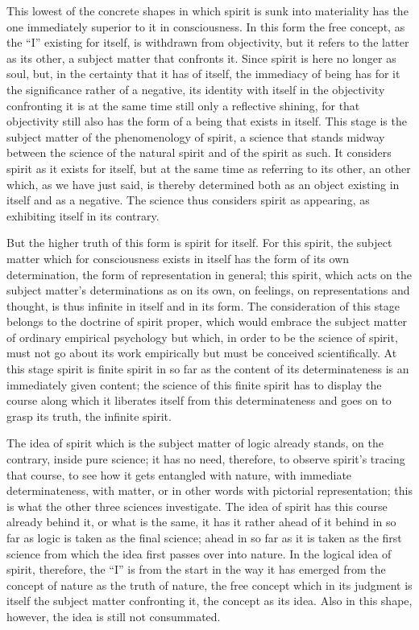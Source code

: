 This lowest of the concrete shapes
in which spirit is sunk into materiality has
the one immediately superior to it in consciousness.
In this form the free concept,
as the “I” existing for itself,
is withdrawn from objectivity,
but it refers to the latter as its other,
a subject matter that confronts it.
Since spirit is here no longer as soul,
but, in the certainty that it has of itself,
the immediacy of being has for it the significance
rather of a negative, its identity with itself
in the objectivity confronting it is at
the same time still only a reflective shining,
for that objectivity still also has the
form of a being that exists in itself.
This stage is the subject matter
of the phenomenology of spirit,
a science that stands midway between the science
of the natural spirit and of the spirit as such.
It considers spirit as it exists for itself,
but at the same time as referring to its other,
an other which, as we have just said, is
thereby determined both as an object
existing in itself and as a negative.
The science thus considers spirit as appearing,
as exhibiting itself in its contrary.

But the higher truth of this form is spirit for itself.
For this spirit, the subject matter which for consciousness
exists in itself has the form of its own determination,
the form of representation in general;
this spirit, which acts on the subject matter's determinations
as on its own, on feelings, on representations and thought,
is thus infinite in itself and in its form.
The consideration of this stage belongs
to the doctrine of spirit proper,
which would embrace the subject matter
of ordinary empirical psychology
but which, in order to be the science of spirit,
must not go about its work empirically
but must be conceived scientifically.
At this stage spirit is finite spirit in so far as
the content of its determinateness is an immediately given content;
the science of this finite spirit has
to display the course along which
it liberates itself from this determinateness
and goes on to grasp its truth, the infinite spirit.

The idea of spirit which is the subject matter of logic
already stands, on the contrary, inside pure science;
it has no need, therefore, to observe spirit's
tracing that course, to see how it gets entangled
with nature, with immediate determinateness, with matter,
or in other words with pictorial representation;
this is what the other three sciences investigate.
The idea of spirit has this course already behind it,
or what is the same, it has it rather ahead of it
behind in so far as logic is taken as the final science;
ahead in so far as it is taken as the first science
from which the idea first passes over into nature.
In the logical idea of spirit, therefore,
the “I” is from the start in the way it has emerged
from the concept of nature as the truth of nature,
the free concept which in its judgment is itself the subject matter
confronting it, the concept as its idea.
Also in this shape, however, the idea is still not consummated.


